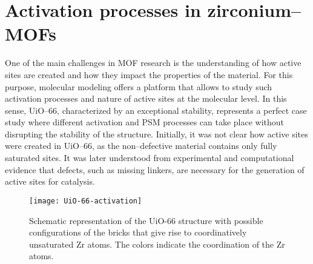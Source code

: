 \section{Activation processes in zirconium--MOFs}
One of the main challenges in MOF research is the understanding of how active sites are created and how they impact the properties of the material. For this purpose, molecular modeling offers a platform that allows to study such activation processes and nature of active sites at the molecular level. In this sense, UiO--66, characterized by an exceptional stability, represents a perfect case study where different activation and PSM processes can take place without disrupting the stability of the structure. Initially, it was not clear how active sites were created in UiO--66, as the non--defective material contains only fully saturated sites. It was later understood from experimental and computational evidence\cite{vermoortele2012electronic} that defects, such as missing linkers, are necessary for the generation of active sites for catalysis.
\begin{figure}[!htbp]
	\centering
	\texttt{[image: UiO-66-activation]}
	\caption{Schematic representation of the UiO-66 structure with possible configurations of the bricks that give rise to coordinatively unsaturated Zr atoms. The colors indicate the coordination of the Zr atoms.}
	\label{fig:UiO-66-activation}
\end{figure}
